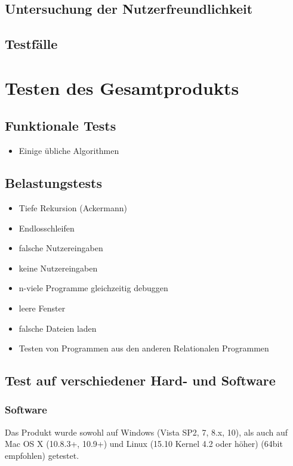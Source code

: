 \documentclass[parskip=full]{scrartcl}
\begin{document}
\subsection{Untersuchung der Nutzerfreundlichkeit}

\subsection{Testfälle}


\section{Testen des Gesamtprodukts}

\subsection{Funktionale Tests}
\begin{itemize}
\item Einige übliche Algorithmen
\end{itemize}


\subsection{Belastungstests}

\begin{itemize}
\item Tiefe Rekursion (Ackermann)
\item Endlosschleifen
\item falsche Nutzereingaben
\item keine Nutzereingaben
\item n-viele Programme gleichzeitig debuggen
\item leere Fenster
\item falsche Dateien laden
\item Testen von Programmen aus den anderen Relationalen Programmen

\end{itemize}

\subsection{Test auf verschiedener Hard- und Software}

\subsubsection{Software}
Das Produkt wurde sowohl auf Windows (Vista SP2, 7, 8.x, 10), als auch auf Mac OS X (10.8.3+, 10.9+) und Linux (15.10 Kernel 4.2 oder höher) (64bit empfohlen) getestet.
\end{document}
